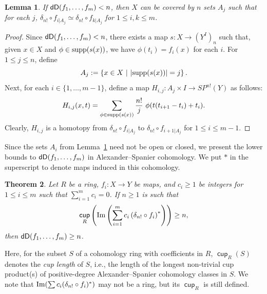 \documentclass[amscd,amssymb,verbatim,10pt]{amsart}
\numberwithin{equation}{section}
\theoremstyle{plain}
\newtheorem{theorem}{Theorem}[section]
\newtheorem{lemma}[theorem]{Lemma}
\theoremstyle{definition}
\DeclareMathOperator{\supp}{{\rm supp}}
\DeclareMathOperator{\cu}{{\mathsf{cup}}}
\def\Im{\protect\operatorname{Im}}
\newcommand{\dD}{{\sf {dD}}}
\begin{document}
\begin{lemma}\label{lem: cover}
   If $\dD(f_1,\dots,f_m)<n$, then $X$ can be covered by $n$ sets $A_j$ such that for each $j$, $\delta_{n!}\circ f_{i|A_j}\simeq \delta_{n!}\circ f_{k|A_j}$ for $1\le i,k\le m$.
\end{lemma}

\begin{proof}
Since $\dD(f_1,\dots,f_m)<n$, there exists a map $s\colon X\to (Y^I)_n$ such that, given $x\in X$ and $\phi\in\supp(s(x))$, we have $\phi(t_i)=f_i(x)$ for each $i$. 
For $1\le j \le n$, define 
\[
A_j:=\left\{x\in X \ \middle|\ \left|\supp(s(x))\right|=j\right\}.
\]
Next, for each $i\in \{1,\dots,m-1\}$, define a map $H_{i,j}\colon A_j\times I\to SP^{n!}(Y)$ as follows:
\[
H_{i,j}(x,t)=\sum_{\phi\in\supp(s(x))}\frac{n!}{j}\ \phi(t(t_{i+1}-t_i)+t_i).
\]
Clearly, $H_{i,j}$ is a homotopy from $\delta_{n!}\circ f_{i|A_j}$ to $\delta_{n!}\circ f_{i+1|A_j}$ for $1\le i \le m-1$.
\end{proof}


Since the sets $A_i$ from Lemma~\ref{lem: cover} need not be open or closed, we present the lower bounds to $\dD(f_1,\dots,f_m)$ in Alexander--Spanier cohomology. We put $\ast$ in the superscript to denote maps induced in this cohomology.

\begin{theorem}\label{thm: lower bound}
    Let $R$ be a ring, $f_i\colon X\to Y$ be maps, and  $c_i\ge 1$ be integers for $1\le i\le m$ such that $\sum_{i=1}^mc_i=0$. If  $n\ge 1$ is such that 
    \[
\cu_R\left(\Im\left(\sum_{i=1}^mc_i\left(\delta_{n!}\circ f_i\right)^*\right)\right)\ge n,
    \]
    then $\dD(f_1,\dots,f_m)\ge n$.
\end{theorem}

Here, for the subset $S$ of a cohomology ring with coefficients in $R$, $\cu_R(S)$ denotes the \emph{cup length} of $S$, i.e., the length of the longest non-trivial cup product(s) of positive-degree Alexander--Spanier cohomology classes in $S$. We note that $\Im(\sum c_i(\delta_{n!}\circ f_i)^*)$ may not be a ring, but its $\cu_R$ is still defined.
\end{document}
